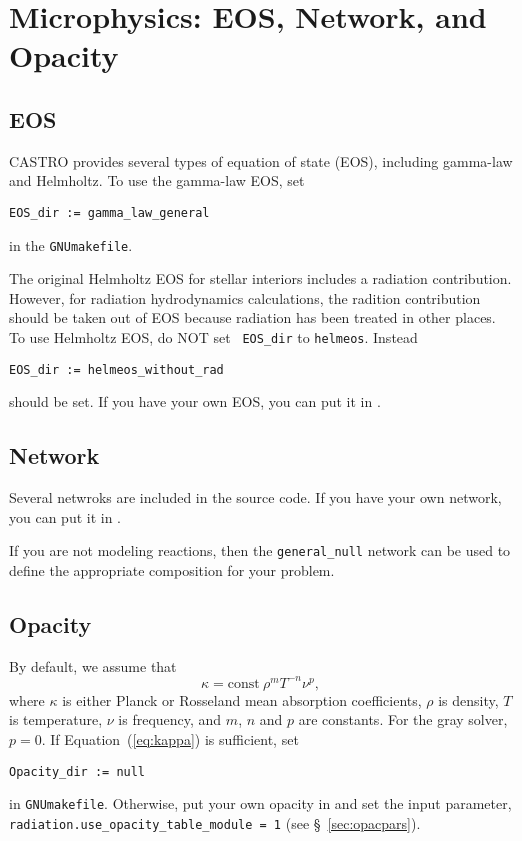 \documentclass[11pt,letterpaper]{article}
\begin{document}
\section{Microphysics: EOS, Network, and Opacity}

\subsection{EOS}

CASTRO provides several types of equation of state (EOS), including
gamma-law and Helmholtz.  To use the gamma-law EOS, set
\begin{verbatim}
EOS_dir := gamma_law_general
\end{verbatim}
in the {\tt GNUmakefile}.

The original Helmholtz EOS for stellar interiors includes a radiation
contribution.  However, for radiation hydrodynamics calculations, the
radition contribution should be taken out of EOS because radiation has
been treated in other places.  To use Helmholtz EOS, do NOT set {\tt
  EOS\_dir} to {\tt helmeos}.  Instead 
\begin{verbatim}
EOS_dir := helmeos_without_rad
\end{verbatim}
should be set.  If you have your own EOS, you can put it in
{\tt{}}.

\subsection{Network}

Several netwroks are included in the source code.  If you have your
own network, you can put it in
{\tt{}}.

If you are not modeling reactions, then the {\tt general\_null}
network can be used to define the appropriate composition for
your problem.

\subsection{Opacity}

By default, we assume that
\begin{equation}
  \kappa = \mathrm{const}\ \rho^{m} T^{-n} \nu^{p} , \label{eq:kappa}
\end{equation}
where $\kappa$ is either Planck or Rosseland mean absorption
coefficients, $\rho$ is density, $T$ is temperature, $\nu$ is
frequency, and $m$, $n$ and $p$ are constants.  For the gray solver,
$p = 0$.  If Equation~(\ref{eq:kappa}) is sufficient, set
\begin{verbatim}
Opacity_dir := null
\end{verbatim}
in {\tt GNUmakefile}.  Otherwise, put your own opacity in
{\tt{}} and set
the input parameter, {\tt radiation.use\_opacity\_table\_module = 1} (see
\S~\ref{sec:opacpars}). 
\end{document}
